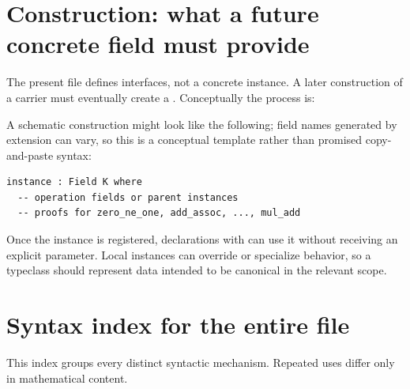 \documentclass[11pt]{article}
\newcommand{\code}[1]{\texttt{\detokenize{#1}}}
\begin{document}
\section{Construction: what a future concrete field must provide}

The present file defines interfaces, not a concrete instance. A later construction of a
carrier \code{K} must eventually create a \code{Field K}. Conceptually the process is:

\begin{center}
\end{center}

A schematic construction might look like the following; field names generated by
extension can vary, so this is a conceptual template rather than promised copy-and-paste
syntax:

\begin{lstlisting}
instance : Field K where
  -- operation fields or parent instances
  -- proofs for zero_ne_one, add_assoc, ..., mul_add
\end{lstlisting}

Once the instance is registered, declarations with \code{[Field K]} can use it without
receiving an explicit parameter. Local instances can override or specialize behavior,
so a typeclass should represent data intended to be canonical in the relevant scope.

\section{Syntax index for the entire file}

This index groups every distinct syntactic mechanism. Repeated uses differ only in
mathematical content.
\end{document}
